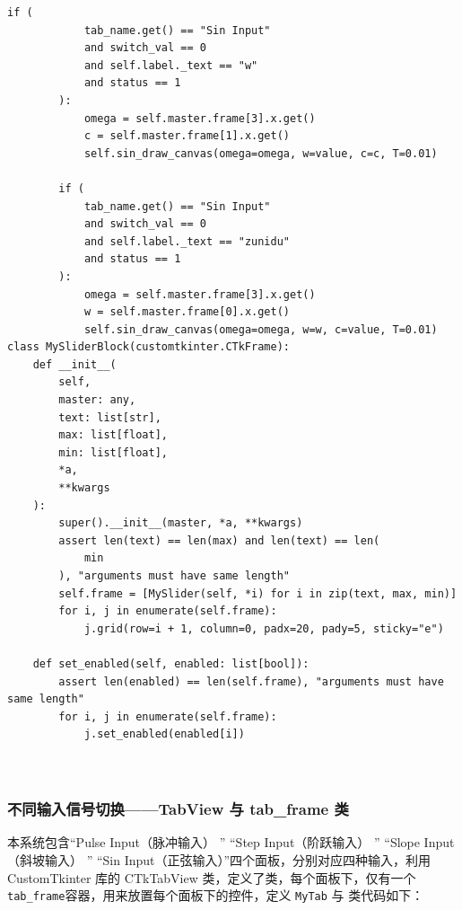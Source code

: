 \documentclass[12pt]{ctexart}
\begin{document}
\begin{lstlisting}[title=MySliderBlock 类代码]
        if (
            tab_name.get() == "Sin Input"
            and switch_val == 0
            and self.label._text == "w"
            and status == 1
        ):
            omega = self.master.frame[3].x.get()
            c = self.master.frame[1].x.get()
            self.sin_draw_canvas(omega=omega, w=value, c=c, T=0.01)

        if (
            tab_name.get() == "Sin Input"
            and switch_val == 0
            and self.label._text == "zunidu"
            and status == 1
        ):
            omega = self.master.frame[3].x.get()
            w = self.master.frame[0].x.get()
            self.sin_draw_canvas(omega=omega, w=w, c=value, T=0.01)
class MySliderBlock(customtkinter.CTkFrame):
    def __init__(
        self,
        master: any,
        text: list[str],
        max: list[float],
        min: list[float],
        *a,
        **kwargs
    ):
        super().__init__(master, *a, **kwargs)
        assert len(text) == len(max) and len(text) == len(
            min
        ), "arguments must have same length"
        self.frame = [MySlider(self, *i) for i in zip(text, max, min)]
        for i, j in enumerate(self.frame):
            j.grid(row=i + 1, column=0, padx=20, pady=5, sticky="e")

    def set_enabled(self, enabled: list[bool]):
        assert len(enabled) == len(self.frame), "arguments must have same length"
        for i, j in enumerate(self.frame):
            j.set_enabled(enabled[i])

	
\end{lstlisting}

\subsubsection{不同输入信号切换——TabView 与 tab_frame 类}

本系统包含“Pulse Input（脉冲输入） ” “Step Input（阶跃输入） ” “Slope Input（斜坡输入） ” “Sin Input（正弦输入）”四个面板，分别对应四种输入，利用 CustomTkinter 库的 CTkTabView 类，定义了类，每个面板下，仅有一个\texttt{tab_frame}容器，用来放置每个面板下的控件，定义 \texttt{MyTab} 与  类代码如下：
\end{document}
